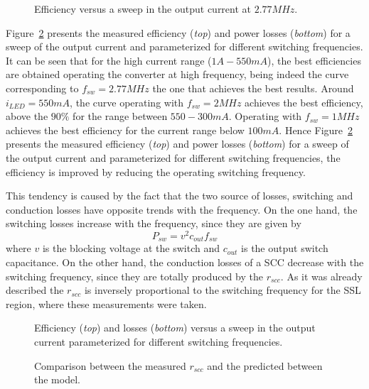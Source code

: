 \begin{figure}[!h]
    \newcommand\pHeigh{4.5cm}
    \newcommand\pWidth{8cm}
    \centering
    
    \caption[]{Efficiency versus a sweep in the output current at $2.77MHz$.}
    \label{fig:eff_vled}
\end{figure}
Figure~\ref{fig:eff_vled_param} presents the measured efficiency (\emph{top}) and power losses (\emph{bottom}) for a sweep of the output current and parameterized for different switching frequencies. It can be seen that for the high current range ($1A-550mA$), the best efficiencies are obtained operating the converter at high frequency, being indeed the curve corresponding to $f_{sw}=2.77MHz$ the one that achieves the best results. Around $i_{LED}=550mA$, the curve operating with $f_{sw}=2MHz$ achieves the best efficiency, above the $90\%$ for the range between $550-300mA$. Operating with $f_{sw}=1MHz$ achieves the best efficiency for the current range below $100mA$. Hence Figure~\ref{fig:eff_vled_param} presents the measured efficiency (\emph{top}) and power losses (\emph{bottom}) for a sweep of the output current and parameterized for different switching frequencies,  the efficiency is improved by reducing the operating switching frequency.

This tendency is caused by the fact that the two source of losses, switching and conduction losses have opposite trends with the frequency. On the one hand, the switching losses increase with the frequency, since they are given by
\begin{equation}
    P_{sw} = v^2 c_{out} f_{sw}
\end{equation}
where $v$ is the blocking voltage at the switch and $c_{out}$ is the output switch capacitance. On the other hand, the conduction losses of a SCC decrease with the switching frequency, since they are totally produced by the $r_{scc}$. As it was already described the $r_{scc}$ is inversely proportional to the switching frequency for the SSL region, where these measurements were taken.

\begin{figure}[!h]
    \newcommand\pHeigh{4.5cm}
    \newcommand\pWidth{8cm}
    \centering
    
    \caption[]{Efficiency (\emph{top}) and losses (\emph{bottom}) versus a sweep in the output current parameterized for different switching frequencies.}
    \label{fig:eff_vled_param}
\end{figure}

\begin{figure}[!h]
    \newcommand\pHeigh{4.5cm}
    \newcommand\pWidth{8cm}
    \centering
    
    \caption[]{Comparison between the measured $r_{scc}$ and the predicted between the model.}
    \label{fig:rscc_vled}
\end{figure}


